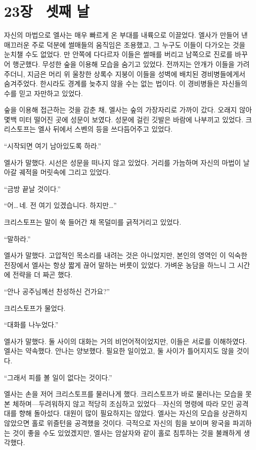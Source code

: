 

\chapter[23장  셋째 날][23장\hspace*{.5em}셋째 날]{23장 \ 셋째 날}



자신의 마법으로 엘사는 매우 빠르게 온 부대를 내륙으로 이끌었다. 엘사가 만들어 낸 매끄러운 주로 덕분에 썰매들의 움직임은 조용했고, 그 누구도 이들이 다가오는 것을 눈치챌 수도 없었다. 만 안쪽에 다다르자 이들은 썰매를 버리고 남쪽으로 진로를 바꾸어 행군했다. 무성한 숲을 이용해 모습을 숨기고 있었다. 전까지는 안개가 이들을 가려주더니, 지금은 머리 위 울창한 상록수 지붕이 이들을 성벽에 배치된 경비병들에게서 숨겨주었다. 한시라도 경계를 늦추지 않을 수는 없는 법이다. 이 경비병들은 자신들의 수를 믿고 자만하고 있었다.

숲을 이용해 접근하는 것을 감춘 채, 엘사는 숲의 가장자리로 가까이 갔다. 오래지 않아 몇백 미터 떨어진 곳에 성문이 보였다. 성문에 걸린 깃발은 바람에 나부끼고 있었다. 크리스토프는 엘사 뒤에서 스벤의 등을 쓰다듬어주고 있었다.

``시작되면 여기 남아있도록 하라.''

엘사가 말했다. 시선은 성문을 떠나지 않고 있었다. 거리를 가늠하며 자신의 마법이 날아갈 궤적을 머릿속에 그리고 있었다.

``금방 끝날 것이다.''

``어\ldots\,네. 전 여기 있겠습니다. 하지만\ldots''

크리스토프는 말이 쑥 들어간 채 목덜미를 긁적거리고 있었다.

``말하라.''

엘사가 말했다. 고압적인 목소리를 내려는 것은 아니었지만, 본인의 영역인 이 익숙한 전장에서 엘사는 항상 짧게 끊어 말하는 버릇이 있었다. 가벼운 농담을 하느니 그 시간에 전략을 더 짜곤 했다.

``안나 공주님께선 찬성하신 건가요?''

크리스토프가 물었다.

``대화를 나누었다.''

엘사가 말했다. 둘 사이의 대화는 거의 비언어적이었지만, 이들은 서로를 이해하였다. 엘사는 약속했다. 안나는 양보했다. 필요한 일이었고, 둘 사이가 틀어지지도 않을 것이다.

``그래서 피를 볼 일이 없다는 것이다.''

엘사는 손을 저어 크리스토프를 물러나게 했다. 크리스토프가 바로 물러나는 모습을 못 본 체하며—두려워하지 않고 적당히 조심하고 있었다—자신의 명령에 따라 모인 공격대를 향해 돌아섰다. 대원이 많이 필요하지는 않았다. 엘사는 자신의 모습을 상관하지 않았으면 홀로 위즐턴을 공격했을 것이다. 극적으로 자신의 힘을 보이며 왕국을 파괴하는 것이 좋을 수도 있었겠지만, 엘사는 암살자와 같이 홀로 침투하는 것을 불쾌하게 생각했다.

